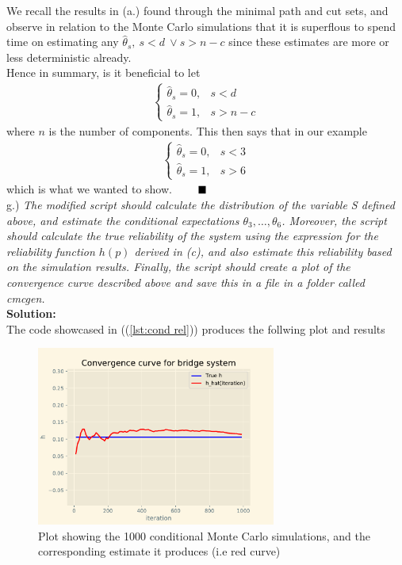 \documentclass[12pt,
               a4paper,
               article,
               oneside,
               english,oldfontcommands]{memoir}
\newcommand{\Q}{ \qquad \hfill \blacksquare}
\let\oldref\ref
\renewcommand{\ref}[1]{(\oldref{#1})}
\newcommand{\spaze}{\vspace{4mm}\\}
\begin{document}
We recall the results in (a.) found through the minimal path and cut sets, and observe in relation to the Monte Carlo simulations that it is superflous to spend time on estimating any $\hat{\theta}_s, \ s < d \ \lor s > n - c$ since these estimates are more or less deterministic already. \vspace{2mm}\\
Hence in summary, is it beneficial to let
\begin{align*}
	\begin{cases}
		\hat{\theta}_s = 0, &  s < d \\[5pt] 
		\hat{\theta}_s = 1, & s > n - c
	\end{cases}
\end{align*}
where $n$ is the number of components. This then says that in our example
\begin{align*}
\begin{cases}
		\hat{\theta}_s = 0, &  s < 3 \\[5pt] 
		\hat{\theta}_s = 1, & s > 6
 \end{cases}
\end{align*}
which is what we wanted to show. $\Q$ \spaze
g.) \emph{The modified script should calculate the distribution of the variable S defined above, and estimate the conditional expectations $\theta_3, \ldots, \theta_6$. Moreover, the script should calculate the true reliability of the system using the expression for the reliability function $h(p)$ derived in (c), and also estimate this reliability based on the simulation results. Finally, the script should create a plot of the convergence curve described above and save this in a file in a folder called cmcgen.} \spaze
\textbf{Solution:} \spaze 
The code showcased in (\ref{lst:cond rel}) produces the follwing plot and results 
\begin{figure}[H]
\centering 
\includegraphics[width=0.7\textwidth]{cmcgen/bridge.pdf}
\caption{Plot showing the 1000 conditional Monte Carlo simulations, and the corresponding estimate it produces (i.e red curve)}
\end{figure}
\end{document}
